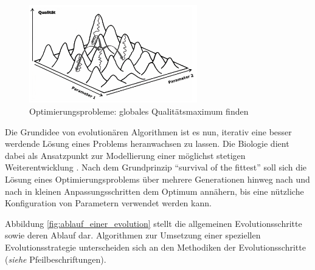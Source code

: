 \begin{figure}[H]
\centering
\includegraphics[width=0.65\textwidth]{img/Evolutionsstrategie_lokale_globale_Maxima.png}
\caption[Optimierungsprobleme: lokale Maxima/Minima finden]{Optimierungsprobleme: globales Qualitätsmaximum finden\protect\footnotemark}
\label{fig:lokale_globale_maxima}
\end{figure}

Die Grundidee von evolutionären Algorithmen ist es nun, iterativ eine besser werdende Lösung eines Problems heranwachsen zu lassen.
Die Biologie dient dabei als Ansatzpunkt zur Modellierung einer möglichst stetigen Weiterentwicklung \cite[S.~141]{schoeneburg}.
Nach dem Grundprinzip \enquote{survival of the fittest} soll sich die Lösung eines Optimierungsproblems über mehrere Generationen hinweg nach und nach in kleinen Anpassungsschritten dem Optimum annähern, bis eine nützliche Konfiguration von Parametern verwendet werden kann.

Abbildung \ref{fig:ablauf_einer_evolution} stellt die allgemeinen Evolutionsschritte sowie deren Ablauf dar.
Algorithmen zur Umsetzung einer speziellen Evolutionsstrategie unterscheiden sich an den Methodiken der Evolutionsschritte (\textit{siehe} Pfeilbeschriftungen).

